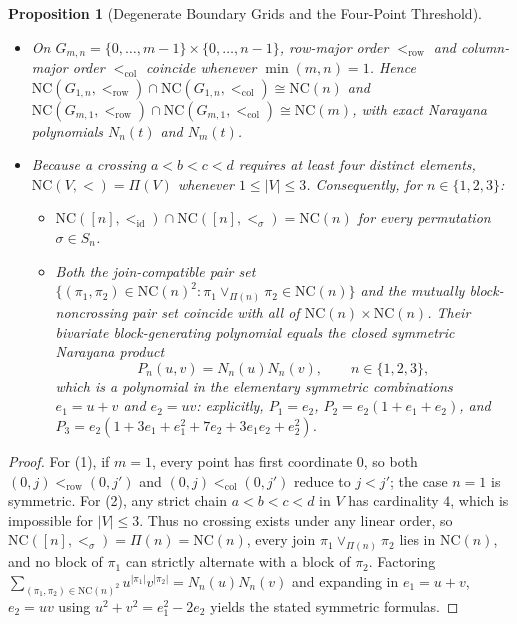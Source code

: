\documentclass[11pt]{article}
\theoremstyle{plain}
\newtheorem{proposition}[theorem]{Proposition}
\theoremstyle{definition}
\newcommand{\NC}{\mathrm{NC}}
\begin{document}
\begin{proposition}[Degenerate Boundary Grids and the Four-Point Threshold]\label{prop:mirage}
\leavevmode
\begin{itemize}\setlength{\itemsep}{2pt}
  \item[(1)] On $G_{m,n} = \{0, \dots, m-1\} \times \{0, \dots, n-1\}$, row-major order $<_{\mathrm{row}}$ and column-major order $<_{\mathrm{col}}$ coincide whenever $\min(m, n) = 1$. Hence $\NC(G_{1,n}, <_{\mathrm{row}}) \cap \NC(G_{1,n}, <_{\mathrm{col}}) \cong \NC(n)$ and $\NC(G_{m,1}, <_{\mathrm{row}}) \cap \NC(G_{m,1}, <_{\mathrm{col}}) \cong \NC(m)$, with exact Narayana polynomials $N_n(t)$ and $N_m(t)$.
  \item[(2)] Because a crossing $a < b < c < d$ requires at least four distinct elements, $\NC(V, <) = \Pi(V)$ whenever $1 \le |V| \le 3$. Consequently, for $n \in \{1, 2, 3\}$:
  \begin{itemize}\setlength{\itemsep}{2pt}
    \item[(a)] $\NC([n], <_{\mathrm{id}}) \cap \NC([n], <_\sigma) = \NC(n)$ for every permutation $\sigma \in S_n$.
    \item[(b)] Both the join-compatible pair set $\{(\pi_1, \pi_2) \in \NC(n)^2 : \pi_1 \vee_{\Pi(n)} \pi_2 \in \NC(n)\}$ and the mutually block-noncrossing pair set coincide with all of $\NC(n) \times \NC(n)$. Their bivariate block-generating polynomial equals the closed symmetric Narayana product
    \[
      P_n(u, v) = N_n(u) N_n(v), \qquad n \in \{1, 2, 3\},
    \]
    which is a polynomial in the elementary symmetric combinations $e_1 = u + v$ and $e_2 = uv$: explicitly, $P_1 = e_2$, $P_2 = e_2(1 + e_1 + e_2)$, and $P_3 = e_2(1 + 3e_1 + e_1^2 + 7e_2 + 3e_1 e_2 + e_2^2)$.
  \end{itemize}
\end{itemize}
\end{proposition}
\begin{proof}
For (1), if $m = 1$, every point has first coordinate $0$, so both $(0, j) <_{\mathrm{row}} (0, j')$ and $(0, j) <_{\mathrm{col}} (0, j')$ reduce to $j < j'$; the case $n = 1$ is symmetric. For (2), any strict chain $a < b < c < d$ in $V$ has cardinality $4$, which is impossible for $|V| \le 3$. Thus no crossing exists under any linear order, so $\NC([n], <_\sigma) = \Pi(n) = \NC(n)$, every join $\pi_1 \vee_{\Pi(n)} \pi_2$ lies in $\NC(n)$, and no block of $\pi_1$ can strictly alternate with a block of $\pi_2$. Factoring $\sum_{(\pi_1,\pi_2) \in \NC(n)^2} u^{|\pi_1|} v^{|\pi_2|} = N_n(u) N_n(v)$ and expanding in $e_1 = u + v$, $e_2 = uv$ using $u^2 + v^2 = e_1^2 - 2e_2$ yields the stated symmetric formulas.
\end{proof}
\end{document}
